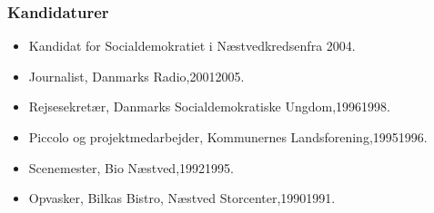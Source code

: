 \documentclass[11pt, a4paper]{awesome-cv}
\begin{document}
\begin{cvletter}
\subsubsection*{Kandidaturer}
\begin{itemize}
\item Kandidat for Socialdemokratiet i Næstvedkredsenfra 2004.
\end{itemize}
\begin{itemize}
\item Journalist, Danmarks Radio,20012005.
\item Rejsesekretær, Danmarks Socialdemokratiske Ungdom,19961998.
\item Piccolo og projektmedarbejder, Kommunernes Landsforening,19951996.
\item Scenemester, Bio Næstved,19921995.
\item Opvasker, Bilkas Bistro, Næstved Storcenter,19901991.
\end{itemize}
\end{cvletter}
\end{document}
